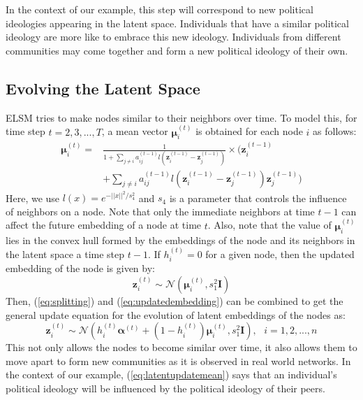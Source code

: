 \documentclass[letterpaper]{article} %
\begin{document}
In the context of our example, this step will correspond to new political ideologies appearing in the latent space. Individuals that have a similar political ideology are more like to embrace this new ideology. Individuals from different communities may come together and form a new political ideology of their own.


\subsection{Evolving the Latent Space}
\label{section:evolvingthelatentspace}
ELSM tries to make nodes similar to their neighbors over time. To model this, for time step ${t} = 2, 3, ..., {T}$, a mean vector $\bm{\mu}_i^{(t)}$ is obtained for each node ${i}$ as follows:
\begin{equation}
\label{eq:latentupdatemean}
\begin{split}
    \bm{\mu}_i^{(t)} =& \frac{1}{1 + \sum_{j \neq i} {a_{ij}^{(t-1)}} l(\mathbf{z}_i^{(t-1)} - \mathbf{z}_j^{(t-1)})} \times    \Big(\mathbf{z}_i^{(t-1)} \\
    &+ \sum_{j \neq i} {a_{ij}^{(t-1)}} l(\mathbf{z}_i^{(t-1)} - \mathbf{z}_j^{(t-1)}) \mathbf{z}_j^{(t-1)}\Big)
\end{split}
\end{equation}
Here, we use $l(x) = e^{-||x||^2/{s_4^2}}$ and ${s_4}$ is a parameter that controls the influence of neighbors on a node. Note that only the immediate neighbors at time ${t-1}$ can affect the future embedding of a node at time ${t}$. Also, note that the value of $\bm{\mu}_i^{(t)}$ lies in the convex hull formed by the embeddings of the node and its neighbors in the latent space a time step $t-1$. If ${h_i^{(t)}} = 0$ for a given node, then the updated embedding of the node is given by:
\begin{equation}
    \label{eq:updatedembedding}
    \mathbf{z}_i^{(t)} \sim \mathcal{N}(\bm{\mu}_i^{(t)}, {s_1^2}\mathbf{I})
\end{equation}
Then, (\ref{eq:splitting}) and (\ref{eq:updatedembedding}) can be combined to get the general update equation for the evolution of latent embeddings of the nodes as:
\begin{equation}
    \label{eq:generalizedupdatedembedding}
    \mathbf{z}_i^{(t)} \sim \mathcal{N}({h_i^{(t)}}\bm{\alpha}^{(t)} + (1-{h_i^{(t)}})\bm{\mu}_i^{(t)}, {s_1^2}\mathbf{I}), \,\,\,\, {i} = 1, 2, ..., {n}
\end{equation}
This not only allows the nodes to become similar over time, it also allows them to move apart to form new communities as it is observed in real world networks. In the context of our example, (\ref{eq:latentupdatemean}) says that an individual's political ideology will be influenced by the political ideology of their peers.
\end{document}
